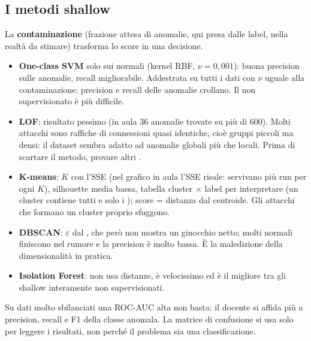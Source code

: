 \subsection{I metodi shallow}
La \textbf{contaminazione} (frazione attesa di anomalie, qui presa dalle label, nella realtà da stimare)
trasforma lo score in una decisione.
\begin{itemize}
  \item \textbf{One-class SVM} solo sui normali (kernel RBF, $\nu = 0{,}001$): buona precision sulle
    anomalie, recall migliorabile. Addestrata su tutti i dati con $\nu$ uguale alla contaminazione:
    precision e recall delle anomalie crollano. Il non supervisionato è più difficile.
  \item \textbf{LOF}: risultato pessimo (in aula 36 anomalie trovate su più di 600). Molti attacchi sono
    raffiche di connessioni quasi identiche, cioè gruppi piccoli ma densi: il dataset sembra adatto ad
    anomalie globali più che locali. Prima di scartare il metodo, provare altri .
  \item \textbf{K-means}: $K$ con l'SSE (nel grafico in aula l'SSE risale: servivano più run per ogni $K$),
    silhouette media bassa, tabella cluster $\times$ label per interpretare (un cluster contiene tutti e
    solo i ); score = distanza dal centroide. Gli attacchi che formano un cluster proprio
    sfuggono.
  \item \textbf{DBSCAN}: $\varepsilon$ dal , che però non mostra un ginocchio netto;
    molti normali finiscono nel rumore e la precision è molto bassa. È la maledizione della
    dimensionalità in pratica.
  \item \textbf{Isolation Forest}: non usa distanze, è velocissimo ed è il migliore tra gli shallow
    interamente non supervisionati.
\end{itemize}

\begin{attenzione}
Su dati molto sbilanciati una ROC-AUC alta non basta: il docente si affida più a precision, recall e F1
della classe anomala. La matrice di confusione si usa solo per leggere i risultati, non perché il
problema sia una classificazione.
\end{attenzione}

